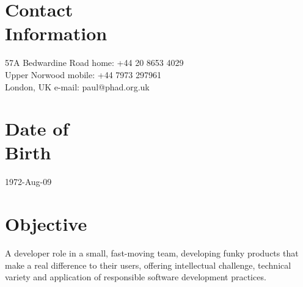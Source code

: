 \documentclass[margin,line]{resume}
\begin{document}
\begin{resume}

    \section{\mysidestyle Contact\\Information}

    57A Bedwardine Road              \hfill home: +44 20 8653 4029          \vspace{0mm}\\\vspace{0mm}%
    Upper Norwood                          \hfill mobile: +44 7973 297961         \vspace{0mm}\\\vspace{0mm}%
    London, UK                                 \hfill e-mail: paul@phad.org.uk         \vspace{0mm}\\\vspace{-4.5mm}%


    \section{\mysidestyle Date of\\Birth}

    1972-Aug-09                     \vspace{0mm}\\\vspace{-4.5mm}%


    \section{\mysidestyle Objective}

    A developer role in a small, fast-moving team, developing funky products that make a real difference to their
    users, offering intellectual challenge, technical variety and application of responsible software development
    practices.



\end{resume}
\end{document}
